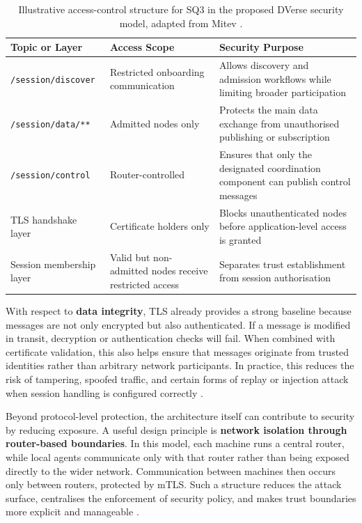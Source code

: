 \documentclass[11pt]{article}
\begin{document}
\begin{table}[H]
    \centering
    \renewcommand{\arraystretch}{1.2}
    \begin{tabularx}{0.95\textwidth}{>{\RaggedRight\arraybackslash}p{}>{\RaggedRight\arraybackslash}p{}>{\RaggedRight\arraybackslash}X}
        \rowcolor{dverseblue!15}
        \toprule
        \textbf{Topic or Layer} & \textbf{Access Scope} & \textbf{Security Purpose} \\
        \midrule
        \texttt{/session/discover} & Restricted onboarding communication & Allows discovery and admission workflows while limiting broader participation \\
        \texttt{/session/data/**} & Admitted nodes only & Protects the main data exchange from unauthorised publishing or subscription \\
        \texttt{/session/control} & Router-controlled & Ensures that only the designated coordination component can publish control messages \\
        TLS handshake layer & Certificate holders only & Blocks unauthenticated nodes before application-level access is granted \\
        Session membership layer & Valid but non-admitted nodes receive restricted access & Separates trust establishment from session authorisation \\
        \bottomrule
    \end{tabularx}
    \caption{Illustrative access-control structure for SQ3 in the proposed DVerse security model, adapted from Mitev \cite{mitev2026}.}
    \label{tab:sq3-acl}
\end{table}

With respect to \textbf{data integrity}, TLS already provides a strong baseline because messages are not only encrypted but also authenticated. If a message is modified in transit, decryption or authentication checks will fail. When combined with certificate validation, this also helps ensure that messages originate from trusted identities rather than arbitrary network participants. In practice, this reduces the risk of tampering, spoofed traffic, and certain forms of replay or injection attack when session handling is configured correctly \cite{mitev2026}.

Beyond protocol-level protection, the architecture itself can contribute to security by reducing exposure. A useful design principle is \textbf{network isolation through router-based boundaries}. In this model, each machine runs a central router, while local agents communicate only with that router rather than being exposed directly to the wider network. Communication between machines then occurs only between routers, protected by mTLS. Such a structure reduces the attack surface, centralises the enforcement of security policy, and makes trust boundaries more explicit and manageable \cite{mitev2026}.
\end{document}
